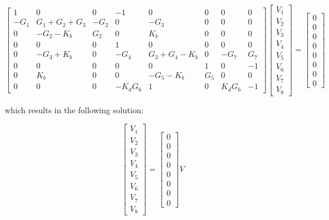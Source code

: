 \begin{equation}
    \begin{bmatrix}
     1 &  0      &  0 &    -1  &     0      &  0  &  0    &  0\\
     -G_1 & G_1+G_2+G_3 & -G_2  & 0   &  -G_3       &  0  &  0    &  0\\
     0   & -G_2-K_b    & G_2  & 0   &   K_b       &  0  &  0    &  0\\
     0   & 0        & 0   & 1 & 0       &  0  & 0   & 0\\
     0   & -G_3+K_b      &  0 &  -G_4  &   G_3+G_4-K_b & 0 &  -G_7    & G_7\\
     0   & 0       & 0  &  0    & 0     & 1  & 0     & -1\\
     0   & K_b        & 0  & 0   &  -G_5-K_b         & G_5   & 0 & 0\\
     0   & 0        & 0  &  -K_dG_6    &  1         & 0   & K_dG_6     & -1
    \end{bmatrix} 
    \begin{bmatrix}
        V_1\\
        V_2\\
        V_3\\
        V_4\\
        V_5\\
        V_6\\
        V_7\\
        V_8
    \end{bmatrix}
    = 
    \begin{bmatrix}
        0\\
        0\\
        0\\
        0\\
        0\\
        0\\
        0\\
        0
    \end{bmatrix}
\label{eqnodos}
\end{equation}

which results in the following solution:

\begin{equation}
    \begin{bmatrix}
        V_1\\
        V_2\\
        V_3\\
        V_4\\
        V_5\\
        V_6\\
        V_7\\
        V_8
    \end{bmatrix}
    = 
    \begin{bmatrix}
        0\\
        0\\
        0\\
        0\\
        0\\
        0\\
        0\\
        0
    \end{bmatrix} V
\label{zeros}
\end{equation}

